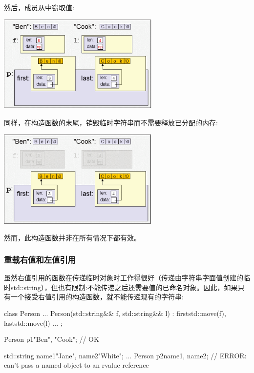 然后，成员从中窃取值:

\begin{center}
	\includegraphics[width=0.6\textwidth]{part1/ch4/images/10}
\end{center}

同样，在构造函数的末尾，销毁临时字符串而不需要释放已分配的内存:

\begin{center}
	\includegraphics[width=0.6\textwidth]{part1/ch4/images/11}
\end{center}

然而，此构造函数并非在所有情况下都有效。

\subsubsection{重载右值和左值引用}

虽然右值引用的函数在传递临时对象时工作得很好（传递由字符串字面值创建的临时std::string），但也有限制:不能传递之后还需要值的已命名对象。因此，如果只有一个接受右值引用的构造函数，就不能传递现有的字符串:

\begin{cppcode}
class Person {
	...
	Person(std::string&& f, std::string&& l)
	: first{std::move(f)}, last{std::move(l)} {
	}
	...
};

Person p1{"Ben", "Cook"}; // OK

std::string name1{"Jane"}, name2{"White"};
...
Person p2{name1, name2}; // ERROR: can’t pass a named object to an rvalue reference
\end{cppcode}

